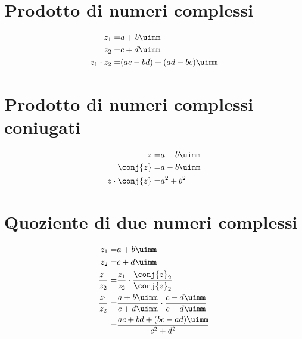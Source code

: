 \section{Prodotto di numeri complessi}
\begin{align}
z_1=&a+b\uimm\\
z_2=&c+d\uimm\\
z_1\cdot z_2=&(ac-bd)+(ad+bc)\uimm
\end{align}
\section{Prodotto di numeri complessi coniugati}
\begin{align}
z=&a+b\uimm\\
\conj{z}=&a-b\uimm\\
z\cdot\conj{z}=&a^2+b^2
\end{align}
\section{Quoziente di due numeri complessi}
\begin{align}
z_1=&a+b\uimm\\
z_2=&c+d\uimm\\
\dfrac{z_1}{z_2}=&\dfrac{z_1}{z_2}\cdot\dfrac{\conj{z}_2}{\conj{z}_2}\\
\dfrac{z_1}{z_2}=&\dfrac{a+b\uimm}{c+d\uimm}\cdot\dfrac{c-d\uimm}{c-d\uimm}\\
=&\dfrac{ac+bd+(bc-ad)\uimm}{c^2+d^2}
\end{align}
